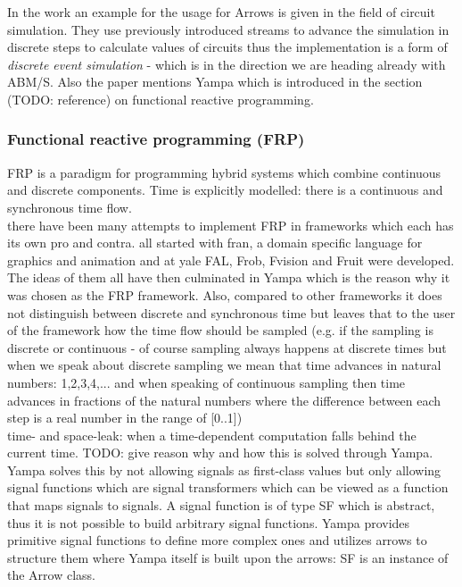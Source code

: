 In the work \cite{Hughes2004} an example for the usage for Arrows is given in the field of circuit simulation. They use previously introduced streams to advance the simulation in discrete steps to calculate values of circuits thus the implementation is a form of \textit{discrete event simulation} - which is in the direction we are heading already with ABM/S. Also the paper mentions Yampa which is introduced in the section (TODO: reference) on functional reactive programming.

\subsubsection{Functional reactive programming (FRP)}
FRP is a paradigm for programming hybrid systems which combine continuous and discrete components. Time is explicitly modelled: there is a continuous and synchronous time flow.  \\

there have been many attempts to implement FRP in frameworks which each has its own pro and contra. all started with fran, a domain specific language for graphics and animation and at yale FAL, Frob, Fvision and Fruit were developed. The ideas of them all have then culminated in Yampa which is the reason why it was chosen as the FRP framework. Also, compared to other frameworks it does not distinguish between discrete and synchronous time but leaves that to the user of the framework how the time flow should be sampled (e.g. if the sampling is discrete or continuous - of course sampling always happens at discrete times but when we speak about discrete sampling we mean that time advances in natural numbers: 1,2,3,4,... and when speaking of continuous sampling then time advances in fractions of the natural numbers where the difference between each step is a real number in the range of [0..1]) \\

time- and space-leak: when a time-dependent computation falls behind the current time. TODO: give reason why and how this is solved through Yampa. \\
Yampa solves this by not allowing signals as first-class values but only allowing signal functions which are signal transformers which can be viewed as a function that maps signals to signals. A signal function is of type SF which is abstract, thus it is not possible to build arbitrary signal functions. Yampa provides primitive signal functions to define more complex ones and utilizes arrows \cite{Hughes2004} to structure them where Yampa itself is built upon the arrows: SF is an instance of the Arrow class. \\

